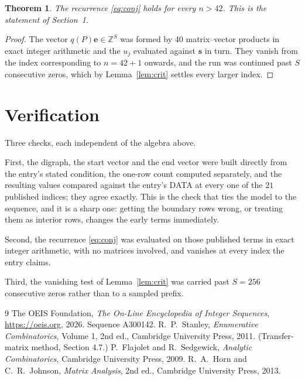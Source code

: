 \documentclass[11pt,a4paper]{article}
\theoremstyle{plain}
\newtheorem{theorem}{Theorem}
\theoremstyle{definition}
\begin{document}
\begin{theorem}
The recurrence \eqref{eq:conj} holds for every $n>42$. This is the statement of
Section~1.
\end{theorem}

\begin{proof}
The vector $q(P)\mathbf{e}\in\mathbb{Z}^{S}$ was formed by $40$ matrix--vector
products in exact integer arithmetic and the $u_j$ evaluated against $\mathbf{s}$ in turn.
They vanish from the index corresponding to $n=42+1$ onwards, and the run was continued
past $S$ consecutive zeros, which by Lemma~\ref{lem:crit} settles every larger index.
\end{proof}

\section{Verification}

Three checks, each independent of the algebra above.

First, the digraph, the start vector and the end vector were built directly from the
entry's stated condition, the one-row count computed separately, and the resulting values
compared against the entry's DATA at every one of the $21$ published indices; they
agree exactly. This is the check that ties the model to the sequence, and it is a sharp one:
getting the boundary rows wrong, or treating them as interior rows, changes the early terms
immediately.

Second, the recurrence \eqref{eq:conj} was evaluated on those published terms in exact
integer arithmetic, with no matrices involved, and vanishes at every index the entry claims.

Third, the vanishing test of Lemma~\ref{lem:crit} was carried past $S=256$ consecutive
zeros rather than to a sampled prefix.

\begin{thebibliography}{9}
 The OEIS Foundation, \emph{The On-Line Encyclopedia of Integer
Sequences}, \url{https://oeis.org}, 2026. Sequence A300142.
 R.~P.~Stanley, \emph{Enumerative Combinatorics}, Volume 1, 2nd ed.,
Cambridge University Press, 2011. (Transfer-matrix method, Section 4.7.)
 P.~Flajolet and R.~Sedgewick, \emph{Analytic Combinatorics}, Cambridge
University Press, 2009.
 R.~A.~Horn and C.~R.~Johnson, \emph{Matrix Analysis}, 2nd ed., Cambridge
University Press, 2013.
\end{thebibliography}
\end{document}
